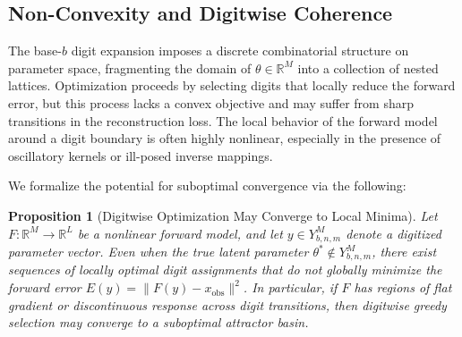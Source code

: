 \documentclass[aps,twocolumn,superscriptaddress,nofootinbib]{revtex4}
\newtheorem{proposition}{Proposition}
\begin{document}
\subsection{Non-Convexity and Digitwise Coherence}

The base-\( b \) digit expansion imposes a discrete combinatorial structure on parameter space, fragmenting the domain of \( \theta \in \mathbb{R}^M \) into a collection of nested lattices. Optimization proceeds by selecting digits that locally reduce the forward error, but this process lacks a convex objective and may suffer from sharp transitions in the reconstruction loss. The local behavior of the forward model around a digit boundary is often highly nonlinear, especially in the presence of oscillatory kernels or ill-posed inverse mappings.

We formalize the potential for suboptimal convergence via the following:

\begin{proposition}[Digitwise Optimization May Converge to Local Minima]
Let \( F : \mathbb{R}^M \rightarrow \mathbb{R}^L \) be a nonlinear forward model, and let \( y \in Y_{b,n,m}^M \) denote a digitized parameter vector. Even when the true latent parameter \( \theta^\ast \notin Y_{b,n,m}^M \), there exist sequences of locally optimal digit assignments that do not globally minimize the forward error \( E(y) = \|F(y) - x_{\text{obs}}\|^2 \). In particular, if \( F \) has regions of flat gradient or discontinuous response across digit transitions, then digitwise greedy selection may converge to a suboptimal attractor basin.
\end{proposition}
\end{document}
